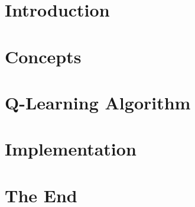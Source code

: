 \section[Intro]{Introduction}

% 

\section[Concepts]{Concepts}


\section[Q-Learn]{Q-Learning Algorithm}



\section[Example]{Implementation}


\section[End]{The End}


